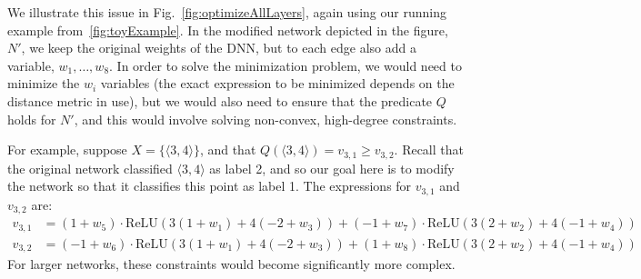 \documentclass{easychair}
\newcommand{\relu}{\text{ReLU}\xspace{}}
\begin{document}
We illustrate this issue in Fig.~\ref{fig:optimizeAllLayers}, again using
our running example from~\ref{fig:toyExample}. In the modified network
depicted in the figure, $N'$, we keep the original
weights of the DNN, but to each edge also add a variable,
$w_1,\ldots,w_8$. In order to solve the minimization problem, we would
need to minimize the $w_i$ variables (the exact expression to be minimized
depends on the distance metric in use), but we would also need to
ensure that the predicate $Q$ holds for $N'$, and this would involve
solving non-convex, high-degree constraints.

For example, suppose $X=\{\langle 3, 4\rangle\}$, and that $Q(\langle
3,4\rangle)=v_{3,1}\geq v_{3,2}$. Recall that the original network
classified $\langle 3,4\rangle$ as label 2, and so our goal here is to
modify the network so that it classifies this point as label 1.
The expressions for $v_{3,1}$ and $v_{3,2}$ are:
\begin{align*}
  v_{3,1}&=
  (1+w_5)\cdot  \relu{}(3(1+w_1)+4(-2+w_3))
  +
  (-1+w_7)\cdot \relu{}(3(2+w_2)+4(-1+w_4))
  \\
  v_{3,2}&=
  (-1+w_6)\cdot \relu{}(3(1+w_1)+4(-2+w_3))
  +
  (1+w_8) \cdot \relu{}(3(2+w_2)+4(-1+w_4))
\end{align*}
For larger networks, these constraints would become significantly more complex.
\end{document}
